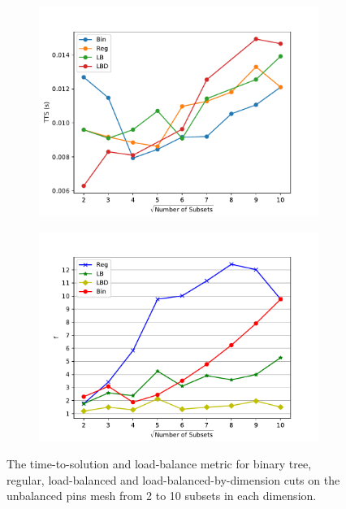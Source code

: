 \begin{figure}[h]
\centering
  \begin{subfigure}[t]{0.49\textwidth}
    \centering
  \includegraphics[scale=0.55]{../../figures/unbalanced_pins_opt_comparison.pdf}
  \end{subfigure}
   \begin{subfigure}[t]{0.49\textwidth}
   \centering
   \includegraphics[scale=0.55]{../../figures/spiderweb_metric_study_bad.pdf}
   \end{subfigure}
  \caption{The time-to-solution and load-balance metric for binary tree, regular, load-balanced and load-balanced-by-dimension cuts on the unbalanced pins mesh from 2 to 10 subsets in each dimension.}
  \label{ubp_comp1}
\end{figure}
